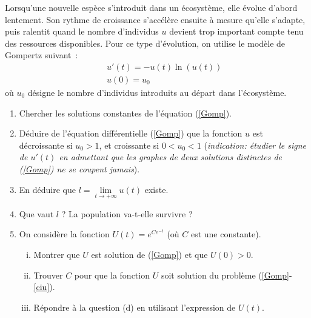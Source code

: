 \begin{exo}
    Lorsqu'une nouvelle espèce s'introduit dans un écosystème, elle évolue d'abord lentement. Son rythme de croissance s'accélère ensuite à mesure qu'elle s'adapte, puis ralentit quand le nombre d'individus $u$ devient trop important compte tenu des ressources disponibles.
    Pour ce type d'évolution, on utilise le modèle de Gompertz suivant~:
    \begin{eqnarray}
        & & u'(t)= -u(t)\ln(u(t)) \label{Gomp}\\
        & & u(0)=u_0 \label{ciu}
    \end{eqnarray}
    où $u_0$ désigne le nombre d'individus introduits au départ dans l'écosystème.
    \begin{enumerate}
        \item
        Chercher les solutions constantes de l'équation (\ref{Gomp}).
        \item Déduire de l'équation différentielle (\ref{Gomp}) que la fonction $u$ est décroissante si $u_0>1$, et croissante si $0<u_0<1$ ({\it indication: étudier le signe de $u'(t)$ en admettant que les graphes de
        deux solutions distinctes de (\ref{Gomp}) ne se coupent jamais}).
        \item
        En déduire que $l = \underset{t \to +\infty}\lim u(t)$ existe.
        \item
        Que vaut $l$ ? La population va-t-elle survivre ?
        \item On considère la fonction $U(t)=e^{Ce^{-t}}$ (où $C$ est une constante).
        \begin{enumerate}[(i)]
            \item Montrer que $U$ est solution de (\ref{Gomp}) et que $U(0)>0$.
            \item Trouver $C$ pour que la fonction $U$ soit solution du problème (\ref{Gomp}-\ref{ciu}). 
            \item Répondre à la question (d) en utilisant l'expression de $U(t)$.
        \end{enumerate}
    \end{enumerate}
\end{exo}


\finchapitre
